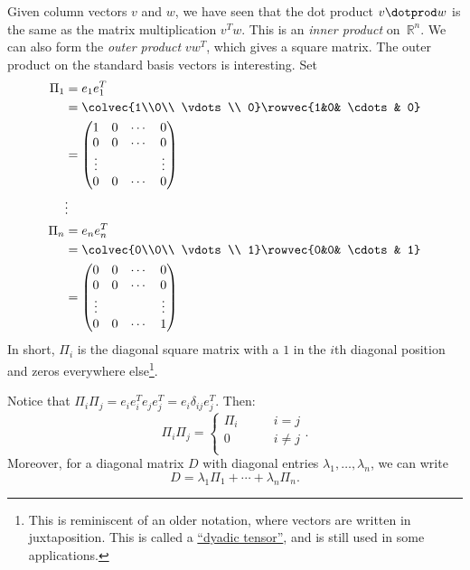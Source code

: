Given column vectors $v$ and $w$, we have seen that the dot product $v\dotprod w$ is the same as the matrix multiplication $v^Tw$.  This is an \emph{inner product} on~$\mathbb{R}^n$.  We can also form the \emph{outer product} $vw^T$, which gives a square matrix.
The outer product on the standard basis vectors is interesting.  Set 
\begin{align*}
\Pi_1 &= e_1e_1^T \\
  &= \colvec{1\\0\\ \vdots \\ 0} \rowvec{1&0& \cdots & 0}\\
  &= \begin{pmatrix}
      1 & 0 & \cdots & 0 \\
      0 & 0 & \cdots & 0 \\
      \vdots & & & \vdots \\
      0 & 0 &\cdots & 0
      \end{pmatrix}\\
&\vdots \\
\Pi_n &= e_n e_n^T \\
  &= \colvec{0\\0\\ \vdots \\ 1} \rowvec{0&0& \cdots & 1}\\
  &= \begin{pmatrix}
      0 & 0 & \cdots & 0 \\
      0 & 0 & \cdots & 0 \\
      \vdots & & & \vdots \\
      0 & 0 &\cdots & 1
      \end{pmatrix}
\end{align*}
In short, $\Pi_i$ is the diagonal square matrix with a $1$ in the $i$th diagonal position and zeros everywhere else\footnote{This is reminiscent of an older notation, where vectors are written in juxtaposition.  This is called a \href{http://en.wikipedia.org/wiki/Dyadic_tensor}{``dyadic tensor''}, and is still used in some applications. }.

Notice that 
$\Pi_i\Pi_j=e_ie_i^Te_je_j^T=e_i\delta_{ij}e_j^T$.  Then:
\[
\Pi_i\Pi_j = \left\{ \begin{array}{cc}
\Pi_i & \qquad i=j \\
0 & \qquad i\neq j \\
\end{array}\right. .
\]
Moreover, for a diagonal matrix $D$ with diagonal entries $\lambda_1,\ldots, \lambda_n$, we can write
\[
D= \lambda_1\Pi_1 + \cdots + \lambda_n\Pi_n.
\]

